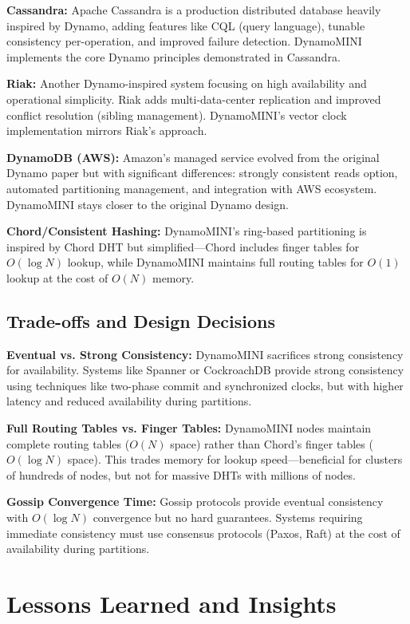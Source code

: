 \documentclass[conference]{IEEEtran}
\begin{document}
\textbf{Cassandra:} Apache Cassandra is a production distributed database heavily inspired by Dynamo, adding features like CQL (query language), tunable consistency per-operation, and improved failure detection. DynamoMINI implements the core Dynamo principles demonstrated in Cassandra.

\textbf{Riak:} Another Dynamo-inspired system focusing on high availability and operational simplicity. Riak adds multi-data-center replication and improved conflict resolution (sibling management). DynamoMINI's vector clock implementation mirrors Riak's approach.

\textbf{DynamoDB (AWS):} Amazon's managed service evolved from the original Dynamo paper but with significant differences: strongly consistent reads option, automated partitioning management, and integration with AWS ecosystem. DynamoMINI stays closer to the original Dynamo design.

\textbf{Chord/Consistent Hashing:} DynamoMINI's ring-based partitioning is inspired by Chord DHT but simplified—Chord includes finger tables for $O(\log N)$ lookup, while DynamoMINI maintains full routing tables for $O(1)$ lookup at the cost of $O(N)$ memory.

\subsection{Trade-offs and Design Decisions}

\textbf{Eventual vs. Strong Consistency:} DynamoMINI sacrifices strong consistency for availability. Systems like Spanner or CockroachDB provide strong consistency using techniques like two-phase commit and synchronized clocks, but with higher latency and reduced availability during partitions.

\textbf{Full Routing Tables vs. Finger Tables:} DynamoMINI nodes maintain complete routing tables ($O(N)$ space) rather than Chord's finger tables ($O(\log N)$ space). This trades memory for lookup speed—beneficial for clusters of hundreds of nodes, but not for massive DHTs with millions of nodes.

\textbf{Gossip Convergence Time:} Gossip protocols provide eventual consistency with $O(\log N)$ convergence but no hard guarantees. Systems requiring immediate consistency must use consensus protocols (Paxos, Raft) at the cost of availability during partitions.

\section{Lessons Learned and Insights}
\end{document}
